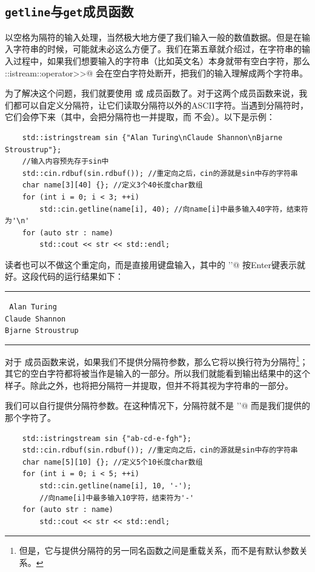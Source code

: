 \subsection*{\texttt{getline}与\texttt{get}成员函数}
以空格为隔符的输入处理，当然极大地方便了我们输入一般的数值数据。但是在输入字符串的时候，可能就未必这么方便了。我们在第五章就介绍过，在字符串的输入过程中，如果我们想要输入的字符串（比如英文名）本身就带有空白字符，那么 \lstinline@std::istream::operator>>@ 会在空白字符处断开，把我们的输入理解成两个字符串。\par
为了解决这个问题，我们就要使用 \lstinline@getline@ 或 \lstinline@get@ 成员函数了。对于这两个成员函数来说，我们都可以自定义分隔符，让它们读取分隔符以外的ASCII字符。当遇到分隔符时，它们会停下来（其中，\lstinline@getline@ 会把分隔符也一并提取，而 \lstinline@get@ 不会）。以下是示例：
\begin{lstlisting}
    std::istringstream sin {"Alan Turing\nClaude Shannon\nBjarne Stroustrup"};
    //输入内容预先存于sin中
    std::cin.rdbuf(sin.rdbuf()); //重定向之后，cin的源就是sin中存的字符串
    char name[3][40] {}; //定义3个40长度char数组
    for (int i = 0; i < 3; ++i)
        std::cin.getline(name[i], 40); //向name[i]中最多输入40字符，结束符为'\n'
    for (auto str : name)
        std::cout << str << std::endl;
\end{lstlisting}
读者也可以不做这个重定向，而是直接用键盘输入，其中的 \lstinline@'\n'@ 按Enter键表示就好。这段代码的运行结果如下：\\\noindent\rule{\linewidth}{.2pt}\texttt{
Alan Turing\\
Claude Shannon\\
Bjarne Stroustrup
}\\\noindent\rule{\linewidth}{.2pt}\par
对于 \lstinline@getline@ 成员函数来说，如果我们不提供分隔符参数，那么它将以换行符为分隔符\footnote{但是，它与提供分隔符的另一同名函数之间是重载关系，而不是有默认参数关系。}；其它的空白字符都将被当作是输入的一部分。所以我们就能看到输出结果中的这个样子。除此之外，\lstinline@getline@ 也将把分隔符一并提取，但并不将其视为字符串的一部分。\par
我们可以自行提供分隔符参数。在这种情况下，分隔符就不是 \lstinline@'\n'@ 而是我们提供的那个字符了。
\begin{lstlisting}
    std::istringstream sin {"ab-cd-e-fgh"};
    std::cin.rdbuf(sin.rdbuf()); //重定向之后，cin的源就是sin中存的字符串
    char name[5][10] {}; //定义5个10长度char数组
    for (int i = 0; i < 5; ++i)
        std::cin.getline(name[i], 10, '-');
        //向name[i]中最多输入10字符，结束符为'-'
    for (auto str : name)
        std::cout << str << std::endl;
\end{lstlisting}\newpage
